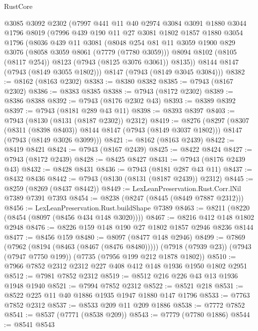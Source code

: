 \begin{lexlean}{RustCore}
\begin{coremodule}
    @3085
    @3092
    @2302
    (@7997
      @441
      @11
      @40
      @2974
      @3084
      @3091
      @1880
      @3044
      @1796
      @8019
      (@7996
        @439
        @190
        @11
        @27
        @3081
        @1802
        @1857
        @1880
        @3054
        @1796
        (@8036
          @439
          @11
          @3081
          (@8048
            @254
            @81
            @11
            @3059
            @1900
            @829
            @3076
            (@8058 @3059 @8061 (@7779 (@7780 @3059)))
            @8094
            @8102
            (@8105 (@8117 @254))
            @8123
            (@7943 (@8125 @3076 @3061))
            @8135))
        @8144
        @8147
        (@7943 (@8149 @3055 @1802)))
      @8147
      (@7943 (@8149 @3045 @3084)))
@8382 := @8162 (@8163 @2302)
@8383 := @8380 @8382
@8385 := @7943 (@8167 @2302)
@8386 := @8383 @8385
@8388 := @7943 (@8172 @2302)
@8389 := @8386 @8388
@8392 := @7943 (@8176 @2302 @43)
@8393 := @8389 @8392
@8397 := @7943 (@8181 @289 @43 @11)
@8398 := @8393 @8397
@8403 := @7943 (@8130 (@8131 (@8187 @2302)) @2312)
@8419 := @8276
    (@8297
      (@8307 (@8311 (@8398 @8403)) @8144 @8147 (@7943 (@8149 @3037 @1802)))
      @8147
      (@7943 (@8149 @3026 @3099)))
@8421 := @8162 (@8163 @2439)
@8422 := @8419 @8421
@8424 := @7943 (@8167 @2439)
@8425 := @8422 @8424
@8427 := @7943 (@8172 @2439)
@8428 := @8425 @8427
@8431 := @7943 (@8176 @2439 @43)
@8432 := @8428 @8431
@8436 := @7943 (@8181 @287 @43 @11)
@8437 := @8432 @8436
@8442 := @7943 (@8130 (@8131 (@8187 @2439)) @2312)
@8445 := @8259 (@8269 (@8437 @8442))
@8449 := LexLeanPreservation.Rust.Corr.lNil @7389 @7391 @7393
@8454 := @8238 (@8247 (@8445 (@8449 @7887 @2312)))
@8456 := LexLeanPreservation.Rust.buildShape @7389
@8463 := @8211 (@8220 (@8454 (@8097 (@8456 @434 @148 @3020))))
@8467 := @8216 @412 @148 @1802 @2948
@8476 := @8226 @159 @148 @190 @27 @1802 @1857 @2946 @8236 @8144
@8477 := @8456 @159
@8480 := @8097 (@8477 @148 @2946)
@8499 := @7869
    (@7962 (@8194 (@8463 (@8467 (@8476 @8480)))))
    (@7918 (@7939 @23))
    (@7943 (@7947 @7750 @199))
    (@7735 (@7956 @199 @212 @1878 @1802))
@8510 := @7966 @7852 @2312 @2312 @227 @408 @412 @148 @1936 @1950 @1802 @2951
@8512 := @7981 @7852 @2312
@8519 := @8512 @216 @226 @43 @13 @1936 @1948 @1940
@8521 := @7994 @7852 @2312
@8522 := @8521 @218
@8531 := @8522 @225 @11 @40 @1886 @1935 @1947 @1880 @147 @1796
@8533 := @7763 @7852 @2312
@8537 := @8533 @209 @11 @209 @1886
@8538 := @7772 @7852
@8541 := @8537 (@7771 (@8538 @209))
@8543 := @7779 (@7780 @1886)
@8544 := @8541 @8543

\end{coremodule}
\end{lexlean}

